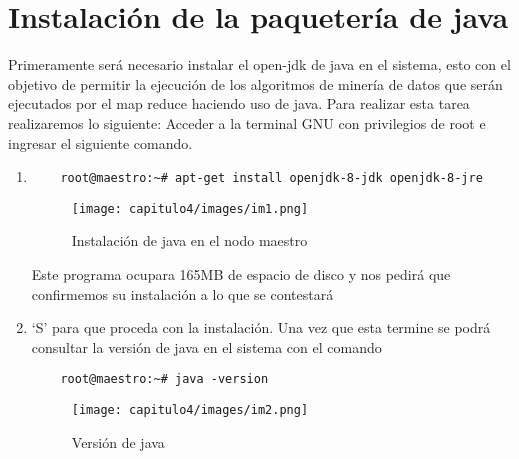 \section{Instalación de la paquetería de java}
Primeramente será necesario instalar el open-jdk de java en el sistema, esto con el objetivo de permitir la ejecución de los algoritmos de minería de datos que serán ejecutados por el map reduce haciendo uso de java. Para realizar esta tarea realizaremos lo siguiente:
Acceder a la terminal GNU con privilegios de root e ingresar el siguiente comando.

\begin{enumerate}
	\item
	\begin{lstlisting} 
	root@maestro:~# apt-get install openjdk-8-jdk openjdk-8-jre
 	\end{lstlisting}

\begin{figure}[!htbp]
	\hypertarget{fig:instalacionjava}{\hspace{1pt}}
	\begin{center}
		\texttt{[image: capitulo4/images/im1.png]}
		\caption{Instalación de java en el nodo maestro}
		\label{fig:instalacionjava}
	\end{center}
\end{figure}

Este programa ocupara 165MB de espacio de disco y nos pedirá que confirmemos su instalación a lo que se contestará 
	\item ‘S’ 
para que proceda con la instalación.
Una vez que esta termine se podrá consultar la versión de java en el sistema con el comando

	\begin{lstlisting} 
	root@maestro:~# java -version
 	\end{lstlisting}
 	
\begin{figure}[!htbp]
	\hypertarget{fig:instalacionjava2}{\hspace{1pt}}
	\begin{center}
		\texttt{[image: capitulo4/images/im2.png]}
		\caption{Versión de java}
		\label{fig:instalacionjava2}
	\end{center}
\end{figure}
\end{enumerate}
